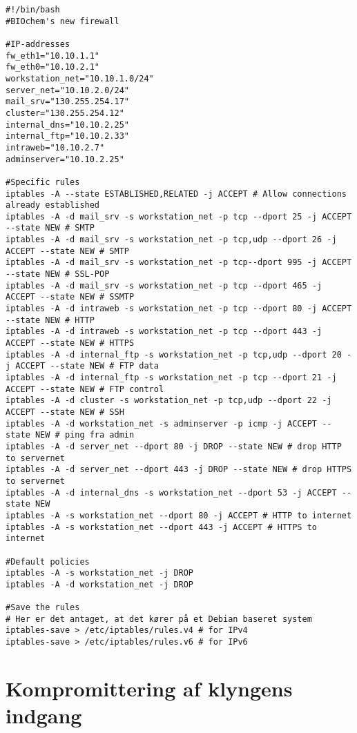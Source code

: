 \documentclass[10pt,a4paper,danish]{article}
\begin{document}
\begin{landscape}
\begin{verbatim}
#!/bin/bash
#BIOchem's new firewall

#IP-addresses
fw_eth1="10.10.1.1"
fw_eth0="10.10.2.1"
workstation_net="10.10.1.0/24"
server_net="10.10.2.0/24"
mail_srv="130.255.254.17"
cluster="130.255.254.12"
internal_dns="10.10.2.25"
internal_ftp="10.10.2.33"
intraweb="10.10.2.7"
adminserver="10.10.2.25"

#Specific rules
iptables -A --state ESTABLISHED,RELATED -j ACCEPT # Allow connections already established
iptables -A -d mail_srv -s workstation_net -p tcp --dport 25 -j ACCEPT --state NEW # SMTP
iptables -A -d mail_srv -s workstation_net -p tcp,udp --dport 26 -j ACCEPT --state NEW # SMTP
iptables -A -d mail_srv -s workstation_net -p tcp--dport 995 -j ACCEPT --state NEW # SSL-POP
iptables -A -d mail_srv -s workstation_net -p tcp --dport 465 -j ACCEPT --state NEW # SSMTP
iptables -A -d intraweb -s workstation_net -p tcp --dport 80 -j ACCEPT --state NEW # HTTP
iptables -A -d intraweb -s workstation_net -p tcp --dport 443 -j ACCEPT --state NEW # HTTPS
iptables -A -d internal_ftp -s workstation_net -p tcp,udp --dport 20 -j ACCEPT --state NEW # FTP data
iptables -A -d internal_ftp -s workstation_net -p tcp --dport 21 -j ACCEPT --state NEW # FTP control
iptables -A -d cluster -s workstation_net -p tcp,udp --dport 22 -j ACCEPT --state NEW # SSH
iptables -A -d workstation_net -s adminserver -p icmp -j ACCEPT --state NEW # ping fra admin
iptables -A -d server_net --dport 80 -j DROP --state NEW # drop HTTP to servernet
iptables -A -d server_net --dport 443 -j DROP --state NEW # drop HTTPS to servernet
iptables -A -d internal_dns -s workstation_net --dport 53 -j ACCEPT --state NEW
iptables -A -s workstation_net --dport 80 -j ACCEPT # HTTP to internet
iptables -A -s workstation_net --dport 443 -j ACCEPT # HTTPS to internet

#Default policies
iptables -A -s workstation_net -j DROP
iptables -A -d workstation_net -j DROP

#Save the rules
# Her er det antaget, at det kører på et Debian baseret system
iptables-save > /etc/iptables/rules.v4 # for IPv4
iptables-save > /etc/iptables/rules.v6 # for IPv6
\end{verbatim}
\end{landscape}

\section{Kompromittering af klyngens indgang}
\end{document}
